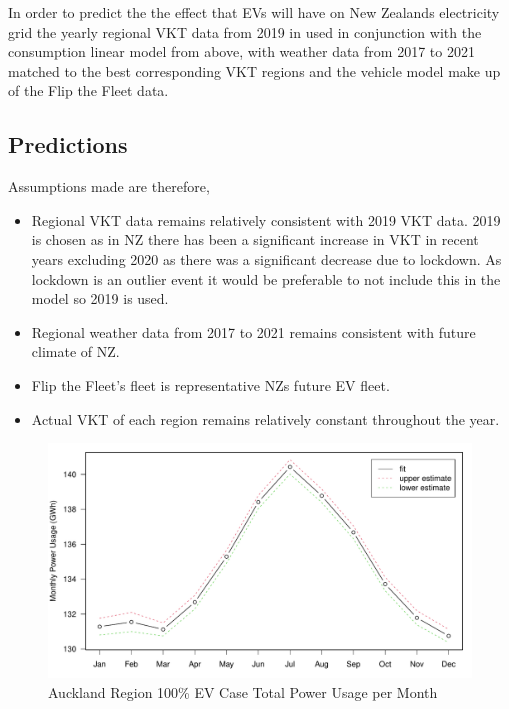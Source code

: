 \documentclass[
]{article}
\begin{document}
In order to predict the the effect that EVs will have on New Zealands
electricity grid the yearly regional VKT data from 2019 in used in
conjunction with the consumption linear model from above, with weather
data from 2017 to 2021 matched to the best corresponding VKT regions and
the vehicle model make up of the Flip the Fleet data.

\hypertarget{predictions}{%
\subsection{Predictions}\label{predictions}}

Assumptions made are therefore,

\begin{itemize}
\item Regional VKT data remains relatively consistent with 2019 VKT data. 2019 is chosen as in NZ there has been a significant increase in VKT in recent years excluding 2020 as there was a significant decrease due to lockdown. As lockdown is an outlier event it would be preferable to not include this in the model so 2019 is used.
\item Regional weather data from 2017 to 2021 remains consistent with future climate of NZ.
\item Flip the Fleet's fleet is representative NZs future EV fleet.
\item Actual VKT of each region remains relatively constant throughout the year.
\end{itemize}

\begin{figure}
\centering
\includegraphics{summary_week4_files/figure-latex/Auckland_power-1.pdf}
\caption{Auckland Region 100\% EV Case Total Power Usage per Month}
\end{figure}
\end{document}

